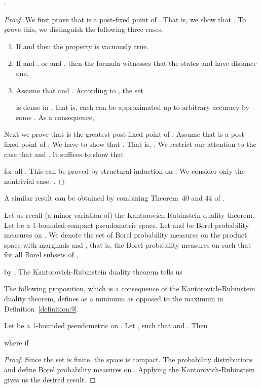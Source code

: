 \documentclass{LMCS}
\begin{document}
\begin{thm}
\label{proposition:6}
.
\end{thm}

\begin{proof}
We first prove that  is a post-fixed point of .  
That is, we show that .  
To prove this, we distinguish the following three cases.
\begin{enumerate}[]
\item
If  and  then 
the property is vacuously true.
\item
If  and , or
 and , then
the formula  witnesses that the
states  and  have distance one.
\item
Assume that  and .
According to \cite[Proposition~39]{BW05:tcs}, the set

is dense in , that is,
each  can be approximated up to
arbitrary accuracy by some .  As a consequence,

\end{enumerate}

Next we prove that  is the greatest post-fixed point of .
Assume that  is a post-fixed point of .  We have to show that
.  That is, . 
We restrict our attention to the case that
 and .  It suffices to show that

for all .  This can be proved by structural induction on
.  We consider only the nontrivial case: .

\end{proof}

A similar result can be obtained by combining Theorem~40 and 44 of \cite{BHMW06:tcs}.

Let us recall (a minor variation of) the Kantorovich-Rubinstein duality theorem.  Let  be a 
1-bounded compact pseudometric space.  Let  and  be Borel probability measures on .  
We denote the set of Borel probability measures on the product space with marginals 
 and , that is, the Borel probability measures  on  such that 
for all Borel subsets  of ,

by .  The Kantorovich-Rubinstein duality theorem tells us


The following proposition, which is a consequence of the Kantorovich-Rubinstein 
duality theorem, defines  as a minimum as opposed to the maximum in 
Definition~\ref{definition:9}.

\begin{prop}
\label{proposition:7}
Let  be a 1-bounded pseudometric on .  Let , 
such that  and .  Then

where  if

\end{prop}
\begin{proof}
Since the set  is finite, the space  is compact.  The probability
distributions  and  define Borel
probability measures on .  Applying the Kantorovich-Rubinstein
gives us the desired result.
\end{proof}
\end{document}
